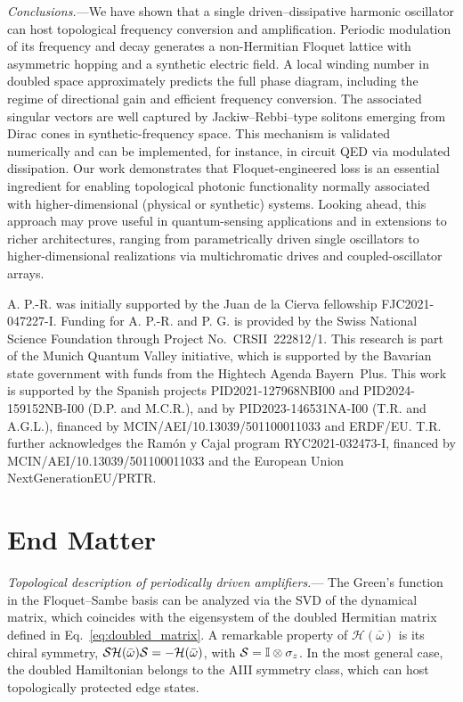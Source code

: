 \documentclass[prl,twocolumn,floatfix,10pt,superscriptaddress]{revtex4-2}
\newcommand{\mcl}[1]{\mathcal{#1}}
\newcommand{\mcH}{{\mcl{H}}}
\begin{document}
\emph{Conclusions.}---We have shown that a single driven–dissipative harmonic oscillator can host topological frequency conversion and amplification. Periodic modulation of its frequency and decay generates a non-Hermitian Floquet lattice with asymmetric hopping and a synthetic electric field. A local winding number in doubled space approximately predicts the full phase diagram, including the regime of directional gain and efficient frequency conversion. The associated singular vectors are well captured by Jackiw–Rebbi–type solitons emerging from Dirac cones in synthetic-frequency space. This mechanism is validated numerically and can be implemented, for instance, in circuit QED via modulated dissipation. Our work demonstrates that Floquet-engineered loss is an essential ingredient for enabling topological photonic functionality normally associated with higher-dimensional (physical or synthetic) systems. Looking ahead, this approach may prove useful in quantum-sensing applications and in extensions to richer architectures, ranging from parametrically driven single oscillators to higher-dimensional realizations via multichromatic drives and coupled-oscillator arrays.
\begin{acknowledgments}
A. P.-R. was initially supported by the Juan de la Cierva fellowship FJC2021-047227-I. Funding for A. P.-R. and P. G. is provided by the Swiss National Science Foundation through Project No.\ CRSII~222812/1. 
This research is part of the Munich Quantum Valley initiative, which is supported by the Bavarian state government with funds from the Hightech Agenda Bayern~Plus. This work is supported by the Spanish projects PID2021-127968NBI00 and PID2024-159152NB-I00 (D.P. and M.C.R.), and by PID2023-146531NA-I00 (T.R. and A.G.L.), financed by MCIN/AEI/10.13039/501100011033 and ERDF/EU. T.R. further acknowledges the Ram\'on y Cajal program RYC2021-032473-I, financed by MCIN/AEI/10.13039/501100011033 and the European Union NextGenerationEU/PRTR.
\end{acknowledgments}





\clearpage
\newpage

\section{End Matter}

\emph{Topological description of periodically driven amplifiers.}--- The Green's function in the Floquet–Sambe basis can be analyzed via the SVD of the dynamical matrix, which coincides with the eigensystem of the doubled Hermitian matrix defined in Eq.~\eqref{eq:doubled_matrix}. A remarkable property of $\mcH(\bar{\omega})$ is its chiral symmetry, ${\cal S}\mcH(\bar{\omega}){\cal S} = -\mcH(\bar{\omega})$, with ${\cal S} = \mathbb{I}\otimes\sigma_z$. In the most general case, the doubled Hamiltonian belongs to the AIII symmetry class, which can host topologically protected edge states. 
\end{document}
